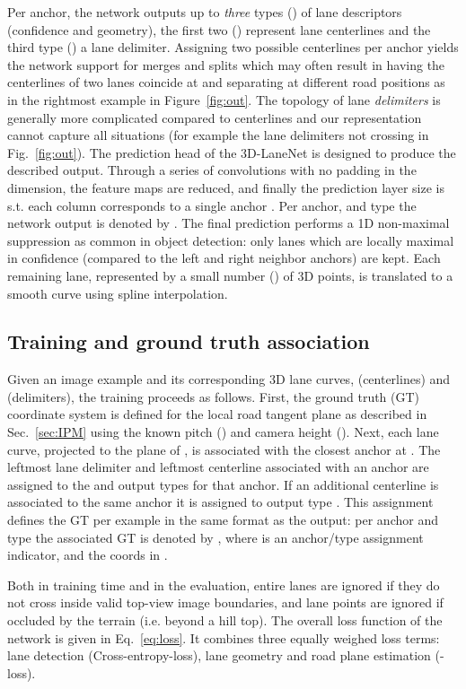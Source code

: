 \documentclass[10pt,twocolumn,letterpaper]{article}
\begin{document}
Per anchor, the network outputs up to \emph{three} types () of lane descriptors (confidence and geometry), the first two () represent lane centerlines and the third type () a lane delimiter. Assigning two possible centerlines per anchor yields the network support for merges and splits which may often result in having the centerlines of two lanes coincide at  and separating at different road positions as in the rightmost example in Figure~\ref{fig:out}. The topology of lane \textit{delimiters} is generally more complicated compared to centerlines and our representation cannot capture all situations (for example the lane delimiters not crossing  in Fig.~\ref{fig:out}). The prediction head of the 3D-LaneNet is designed to produce the described output. Through a series of convolutions with no padding in the  dimension, the feature maps are reduced, and finally the prediction layer size is  s.t. each column  corresponds to a single anchor . Per anchor,  and type  the network output is denoted by . 
The final prediction performs a 1D non-maximal suppression as common in object detection: only lanes which are locally maximal in confidence (compared to the left and right neighbor anchors) are kept. Each remaining lane, represented by a small number () of 3D points, is translated to a smooth curve using spline interpolation.  


\subsection{Training and ground truth association}\label{sec:training}

Given an image example and its corresponding 3D lane curves,  (centerlines) and  (delimiters), the training proceeds as follows. First, the ground truth (GT) coordinate system  is defined for the local road tangent plane as described in Sec.~\ref{sec:IPM} using the known pitch () and camera height (). Next, each lane curve, projected to the  plane of , is associated with the closest anchor at . The leftmost lane delimiter and leftmost centerline associated with an anchor are assigned to the  and  output types for that anchor. If an additional centerline is associated to the same anchor it is assigned to output type . This assignment defines the GT per example in the same format as the output: per anchor  and type  the associated GT is denoted by , where  is an anchor/type assignment indicator, and the coords in .  

Both in training time and in the evaluation, entire lanes are ignored if they do not cross  inside valid top-view image boundaries, and lane points are ignored if occluded by the terrain (i.e. beyond a hill top). The overall loss function of the network is given in Eq.~\ref{eq:loss}. It combines three equally weighed loss terms: lane detection (Cross-entropy-loss), lane geometry and road plane estimation (-loss). 
\end{document}
